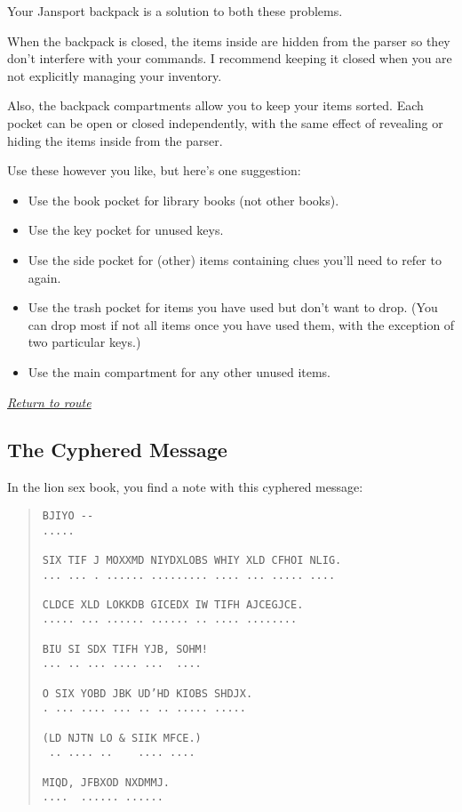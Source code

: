 \documentclass[a5paper]{extarticle}
\begin{document}
Your Jansport backpack is a solution to both these problems.

When the backpack is closed, the items inside are hidden from the parser
so they don't interfere with your commands. I recommend keeping it closed
when you are not explicitly managing your inventory.

Also, the backpack compartments allow you to keep your items sorted.
Each pocket can be open or closed independently,
with the same effect of revealing or hiding the items inside from the parser.

Use these however you like, but here's one suggestion:

\begin{itemize}
\item
  Use the book pocket for library books (not other books).
\item
  Use the key pocket for unused keys.
\item
  Use the side pocket for (other) items containing clues
  you'll need to refer to again.
\item
  Use the trash pocket for items you have used but don't want to drop.
  (You can drop most if not all items once you have used them,
  with the exception of two particular keys.)
\item
  Use the main compartment for any other unused items.
\end{itemize}


\hyperref[sec:route-1]{\emph{Return to route}}

\newpage
\subsection{The Cyphered Message}\label{sec:nb-cyphered-message}

In the lion sex book, you find a note with this cyphered message:

\begin{quote}
\begin{verbatim}
BJIYO --
.....

SIX TIF J MOXXMD NIYDXLOBS WHIY XLD CFHOI NLIG.
... ... . ...... ......... .... ... ..... ....

CLDCE XLD LOKKDB GICEDX IW TIFH AJCEGJCE.
..... ... ...... ...... .. .... ........

BIU SI SDX TIFH YJB, SOHM!
... .. ... .... ...  ....

O SIX YOBD JBK UD’HD KIOBS SHDJX.
. ... .... ... .. .. ..... .....

(LD NJTN LO & SIIK MFCE.)
 .. .... ..    .... ....

MIQD, JFBXOD NXDMMJ.
....  ...... ......
\end{verbatim}
\end{quote}
\end{document}
